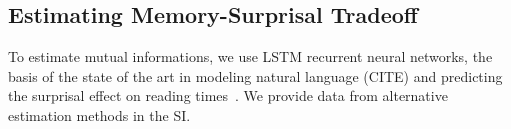 \documentclass[11pt,letterpaper]{article}
\begin{document}
\subsection{Estimating Memory-Surprisal Tradeoff}\label{sec:method}
To estimate mutual informations, we use LSTM recurrent neural networks, the basis of the state of the art in modeling natural language (CITE) and predicting the surprisal effect on reading times~\citep{frank-insensitivity-2011, goodkind-predictive-2018}.
We provide data from alternative estimation methods in the SI.


\end{document}

